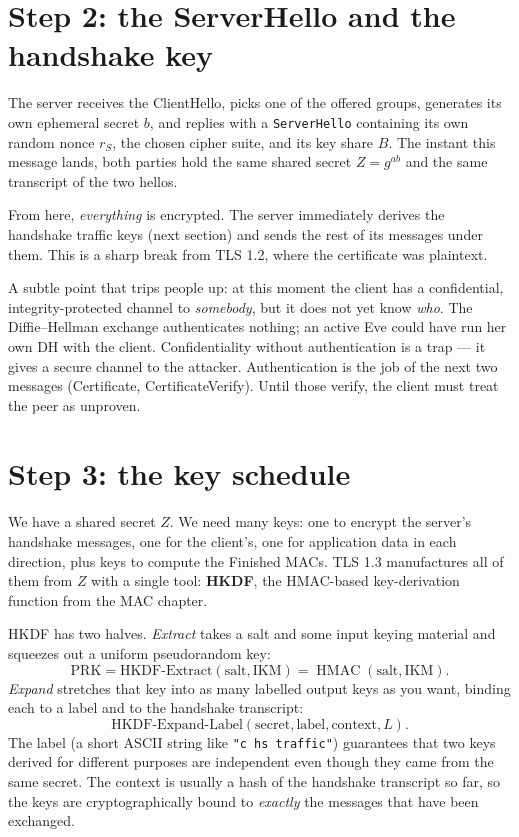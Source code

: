 \section{Step 2: the ServerHello and the handshake key}

The server receives the ClientHello, picks one of the offered groups, generates
its own ephemeral secret $b$, and replies with a \texttt{ServerHello} containing
its own random nonce $r_S$, the chosen cipher suite, and its key share $B$. The
instant this message lands, both parties hold the same shared secret $Z = g^{ab}$
and the same transcript of the two hellos.

From here, \emph{everything} is encrypted. The server immediately derives the
handshake traffic keys (next section) and sends the rest of its messages under
them. This is a sharp break from TLS 1.2, where the certificate was plaintext.

\begin{trapbox}
A subtle point that trips people up: at this moment the client has a confidential,
integrity-protected channel to \emph{somebody}, but it does not yet know
\emph{who}. The Diffie--Hellman exchange authenticates nothing; an active Eve could
have run her own DH with the client. Confidentiality without authentication is a
trap --- it gives a secure channel to the attacker. Authentication is the job of
the next two messages (Certificate, CertificateVerify). Until those verify, the
client must treat the peer as unproven.
\end{trapbox}

\section{Step 3: the key schedule}
\label{ch25:schedule}

We have a shared secret $Z$. We need many keys: one to encrypt the server's
handshake messages, one for the client's, one for application data in each
direction, plus keys to compute the Finished MACs. TLS 1.3 manufactures all of
them from $Z$ with a single tool: \textbf{HKDF}, the HMAC-based key-derivation
function from the MAC chapter.

HKDF has two halves. \emph{Extract} takes a salt and some input keying material
and squeezes out a uniform pseudorandom key:
\[
\mathrm{PRK} = \mathrm{HKDF\text{-}Extract}(\text{salt}, \text{IKM})
= \operatorname{HMAC}(\text{salt}, \text{IKM}).
\]
\emph{Expand} stretches that key into as many labelled output keys as you want,
binding each to a label and to the handshake transcript:
\[
\mathrm{HKDF\text{-}Expand\text{-}Label}(\text{secret}, \text{label}, \text{context}, L).
\]
The label (a short ASCII string like \texttt{"c hs traffic"}) guarantees that two
keys derived for different purposes are independent even though they came from the
same secret. The context is usually a hash of the handshake transcript so far, so
the keys are cryptographically bound to \emph{exactly} the messages that have been
exchanged.

